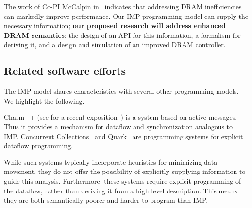 The work of Co-PI McCalpin in~\cite{Diamond2011} indicates that
addressing DRAM inefficiencies can markedly improve performance.
Our \ac{IMP} programming model can supply the necessary information;
\textbf{our proposed research will address enhanced DRAM semantics}:
the design of an API for this
information, a formalism for deriving it, and a design and simulation of
an improved DRAM controller.

\subsection{Related software efforts}

The \ac{IMP} model shares characteristics with several other programming
models. We highlight the following.

Charm++ (see for a recent exposition~\cite{Kale:controlling}) is a system based
on active messages. Thus it provides a mechanism for dataflow and synchronization
analogous to \ac{IMP}. 
%
Concurrent Collections~\cite{CnCmodel} and Quark~\cite{Yarkhan:quark-report}
are programming systems for explicit dataflow programming.

While such systems typically incorporate heuristics for 
minimizing data movement, they do not offer the possibility
of explicitly supplying information to guide this analysis.
Furthermore, these systems require explicit
programming of the dataflow, rather than deriving it from a high level description.
This means they are both semantically poorer and harder to program than \ac{IMP}.

\endinput

The \ac{IMP} model was designed to change the abstraction level of parallel programming.
Rather than completely abstracting away from implementation details, 
the model has as its basic construct `distributed kernels' through
which the programmer indicates an algorithm kernel together with 
the distribution of data and work involved. The main theoretical result
is then that data movement (or equivalently: data dependencies)
can be formally derivable. Thus, at a low cost of extra programming
investment, the model provides lower software layers with a surprisingly
rich set of objects and semantics over which to reason, and 
with which to optimize performance.

Many of the ideas in the \ac{IMP} model are not new; however, typically they 
are only available implemented in specific programming systems. 
By being more abstract, \ac{IMP} offers
the advantage of being targetable to existing and future implementation layers.

